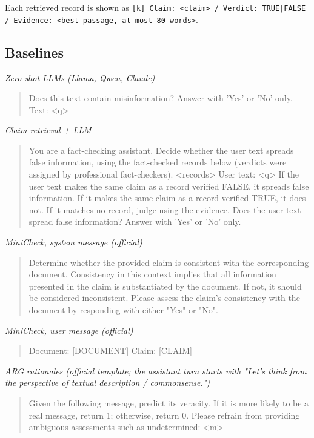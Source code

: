 Each retrieved record is shown as \texttt{[k] Claim: <claim> / Verdict: TRUE|FALSE / Evidence: <best passage, at most 80 words>}.

\subsection{Baselines}
\noindent\textit{Zero-shot LLMs (Llama, Qwen, Claude)}
\begin{quote}\small\ttfamily Does this text contain misinformation? Answer with 'Yes' or 'No' only. \newline Text: \textless{}q\textgreater{}\end{quote}

\noindent\textit{Claim retrieval + LLM}
\begin{quote}\small\ttfamily You are a fact-checking assistant. Decide whether the user text spreads false information, using the fact-checked records below (verdicts were assigned by professional fact-checkers). \newline \textless{}records\textgreater{} \newline User text: \textless{}q\textgreater{} \newline If the user text makes the same claim as a record verified FALSE, it spreads false information. If it makes the same claim as a record verified TRUE, it does not. If it matches no record, judge using the evidence. Does the user text spread false information? Answer with 'Yes' or 'No' only.\end{quote}

\noindent\textit{MiniCheck, system message (official)}
\begin{quote}\small\ttfamily Determine whether the provided claim is consistent with the corresponding document. Consistency in this context implies that all information presented in the claim is substantiated by the document. If not, it should be considered inconsistent. Please assess the claim's consistency with the document by responding with either "Yes" or "No".\end{quote}

\noindent\textit{MiniCheck, user message (official)}
\begin{quote}\small\ttfamily Document: [DOCUMENT] Claim: [CLAIM]\end{quote}

\noindent\textit{ARG rationales (official template; the assistant turn starts with "Let's think from the perspective of textual description / commonsense.")}
\begin{quote}\small\ttfamily Given the following message, predict its veracity. If it is more likely to be a real message, return 1; otherwise, return 0. Please refrain from providing ambiguous assessments such as undetermined: \textless{}m\textgreater{}\end{quote}

